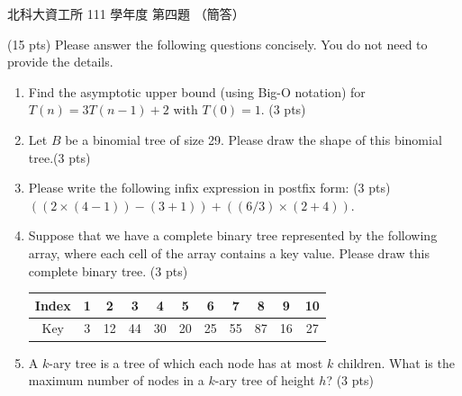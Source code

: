 \begin{pastexam}[label={px:ntut-111-ci-03}]{北科大資工所 111 學年度 第四題}
（簡答）

(15 pts) Please answer the following questions concisely. You do not need to provide the details.
\begin{enumerate}[label=(\arabic*)]
\item Find the asymptotic upper bound (using Big-O notation) for $T(n) = 3T(n-1) + 2$ with $T(0) = 1$. (3 pts)
\item Let $B$ be a binomial tree of size 29. Please draw the shape of this binomial tree.(3 pts)
\item Please write the following infix expression in postfix form: (3 pts)\\
$((2\times(4-1))-(3+1))+((6/3)\times(2+4))$.
\item Suppose that we have a complete binary tree represented by the following array, where each cell of the array contains a key value. Please draw this complete binary tree. (3 pts)
\begin{center}
\begin{tabular}{|c|c|c|c|c|c|c|c|c|c|c|}\hline
Index & 1 & 2 & 3 & 4 & 5 & 6 & 7 & 8 & 9 & 10\\\hline
Key & 3 & 12 & 44 & 30 & 20 & 25 & 55 & 87 & 16 & 27\\\hline
\end{tabular}
\end{center}
\item A $k$-ary tree is a tree of which each node has at most $k$ children. What is the maximum number of nodes in a $k$-ary tree of height $h$? (3 pts)
\end{enumerate}
\end{pastexam}


